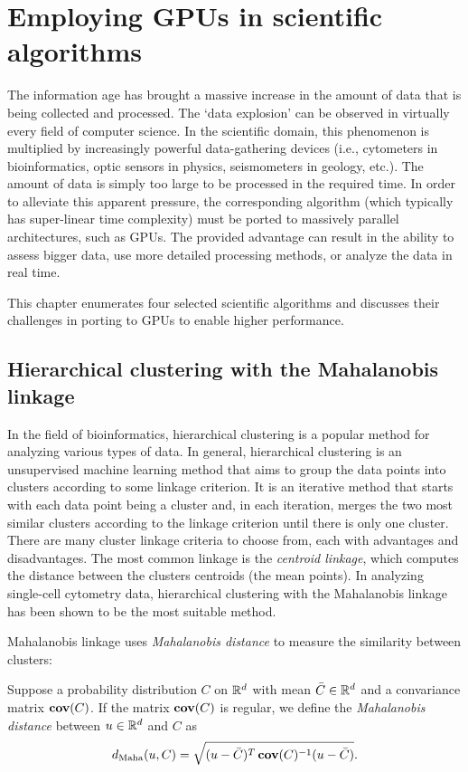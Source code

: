 \chapter{Employing GPUs in scientific algorithms}

The information age has brought a massive increase in the amount of data that is being collected and processed. The `data explosion' can be observed in virtually every field of computer science. In the scientific domain, this phenomenon is multiplied by increasingly powerful data-gathering devices (i.e., cytometers in bioinformatics, optic sensors in physics, seismometers in geology, etc.). The amount of data is simply too large to be processed in the required time. In order to alleviate this apparent pressure, the corresponding algorithm (which typically has super-linear time complexity) must be ported to massively parallel architectures, such as GPUs. The provided advantage can result in the ability to assess bigger data, use more detailed processing methods, or analyze the data in real time.

This chapter enumerates four selected scientific algorithms and discusses their challenges in porting to GPUs to enable higher performance.

\section{Hierarchical clustering with the Ma\-ha\-la\-no\-bis linkage}

In the field of bioinformatics, hierarchical clustering is a popular method for analyzing various types of data. 
In general, hierarchical clustering is an unsupervised machine learning method that aims to group the data points into clusters according to some linkage criterion.
It is an iterative method that starts with each data point being a cluster and, in each iteration, merges the two most similar clusters according to the linkage criterion until there is only one cluster.
There are many cluster linkage criteria to choose from, each with advantages and disadvantages. 
The most common linkage is the \emph{centroid linkage}, which computes the distance between the clusters centroids (the mean points).
In analyzing single-cell cytometry data, hierarchical clustering with the Mahalanobis linkage has been shown to be the most suitable method.

Mahalanobis linkage uses \emph{Mahalanobis distance} to measure the similarity between clusters:
\begin{defn}
    Suppose a probability distribution $C$ on $\mathbb{R}^d$ with mean $\bar{C} \in \mathbb{R}^d$ and a convariance matrix $\operatorname{\textbf{cov}}(C)$. If the matrix $\operatorname{\textbf{cov}}(C)$ is regular, we define the \emph{Mahalanobis distance} between $u \in \mathbb{R}^d$ and $C$ as
    \begin{equation}
    d_\text{Maha}(u,C) = \sqrt{(u-\bar{C})^T\operatorname{\textbf{cov}}(C)^{-1}(u-\bar{C})}.
    \end{equation}\label{eq01:maha}
\end{defn}

